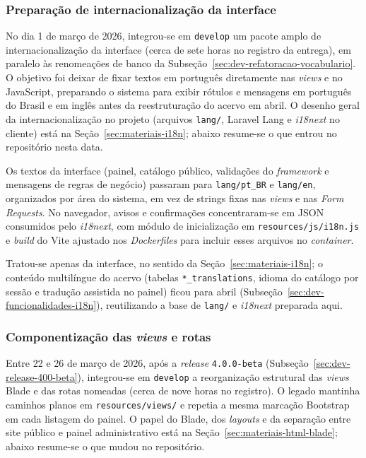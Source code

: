 \subsubsection{Preparação de internacionalização da interface}\label{sec:dev-refatoracao-i18n-prep}

No dia 1 de março de 2026, integrou-se em \texttt{develop} um pacote amplo de internacionalização da interface (cerca de sete horas no registro da entrega), em paralelo às renomeações de banco da Subseção~\ref{sec:dev-refatoracao-vocabulario}. O objetivo foi deixar de fixar textos em português diretamente nas \textit{views} e no JavaScript, preparando o sistema para exibir rótulos e mensagens em português do Brasil e em inglês antes da reestruturação do acervo em abril. O desenho geral da internacionalização no projeto (arquivos \texttt{lang/}, Laravel Lang e \textit{i18next} no cliente) está na Seção~\ref{sec:materiais-i18n}; abaixo resume-se o que entrou no repositório nesta data.

Os textos da interface (painel, catálogo público, validações do \textit{framework} e mensagens de regras de negócio) passaram para \texttt{lang/pt\_BR} e \texttt{lang/en}, organizados por área do sistema, em vez de strings fixas nas \textit{views} e nas \textit{Form Requests}. No navegador, avisos e confirmações concentraram-se em JSON consumidos pelo \textit{i18next}, com módulo de inicialização em \texttt{resources/js/i18n.js} e \textit{build} do Vite ajustado nos \textit{Dockerfiles} para incluir esses arquivos no \textit{container}.

Tratou-se apenas da interface, no sentido da Seção~\ref{sec:materiais-i18n}; o conteúdo multilíngue do acervo (tabelas \texttt{*\_translations}, idioma do catálogo por sessão e tradução assistida no painel) ficou para abril (Subseção~\ref{sec:dev-funcionalidades-i18n}), reutilizando a base de \texttt{lang/} e \textit{i18next} preparada aqui.


\subsubsection{Componentização das \textit{views} e rotas}\label{sec:dev-refatoracao-blade}

Entre 22 e 26 de março de 2026, após a \textit{release} \texttt{4.0.0-beta} (Subseção~\ref{sec:dev-release-400-beta}), integrou-se em \texttt{develop} a reorganização estrutural das \textit{views} Blade e das rotas nomeadas (cerca de nove horas no registro). O legado mantinha caminhos planos em \texttt{resources/views/} e repetia a mesma marcação Bootstrap em cada listagem do painel. O papel do Blade, dos \textit{layouts} e da separação entre site público e painel administrativo está na Seção~\ref{sec:materiais-html-blade}; abaixo resume-se o que mudou no repositório.

